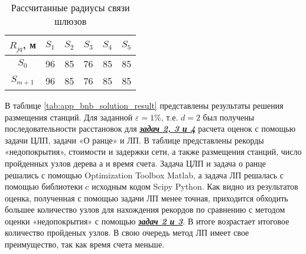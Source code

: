   \begin{table}[h!]\centering
    \begin{tabular}{|c|c c c c c|}\hline
        
        $R_{jq}$, м&	$S_1$& $S_2$& $S_3$& $S_4$& $S_5$ \\
        \hline
        $S_0$& 96&	85&	76&	85&	85\\
        $S_{m+1}$& 96&	85&	76&	85&	85\\
        \hline
  \end{tabular}\caption{Рассчитанные радиусы связи шлюзов}\label{tab:app_gateway_link}
  \end{table}


В таблице \cref{tab:app_bnb_solution_result} представлены результаты решения размещения станций. Для заданной $\varepsilon=1\%$, т.е. $d=2$ был получены последовательности расстановок для \underline{\textit{\textbf{задач 2, 3 и 4}}} расчета оценок с помощью задачи ЦЛП, задачи «О ранце» и ЛП. В таблице представлены рекорды «недопокрытия», стоимости и задержки сети, а также размещения станций, число пройденных узлов дерева а и время счета.
Задача ЦЛП и задача о ранце решались с помощью Optimization Toolbox Matlab, а задача ЛП решалась с помощью библиотеки c исходным кодом Scipy Python. Как видно из результатов оценка, полученная с помощью задачи ЛП менее точная, приходится обходить большее количество узлов для нахождения рекордов по сравнению с методом оценки «недопокрытия» с помощью \underline{\textit{\textbf{задач 2 и 3}}}. В итоге возрастает итоговое количество пройденых узлов. В свою очередь метод ЛП имеет свое преимущество, так как время счета меньше.


